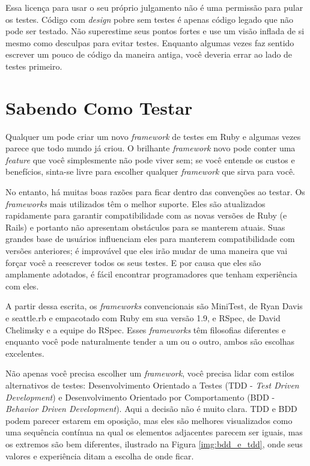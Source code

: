 Essa licença para usar o seu próprio julgamento não é uma permissão para pular os testes. Código com \textit{design} pobre sem testes é apenas código legado que não pode ser testado. Não superestime seus pontos fortes e use um visão inflada de si mesmo como desculpas para evitar testes. Enquanto algumas vezes faz sentido escrever um pouco de código da maneira antiga, você deveria errar ao lado de testes primeiro.

\section{Sabendo Como Testar}

Qualquer um pode criar um novo \textit{framework} de testes em Ruby e algumas vezes parece que todo mundo já criou. O brilhante \textit{framework} novo pode conter uma \textit{feature} que você simplesmente não pode viver sem; se você entende os custos e benefícios, sinta-se livre para escolher qualquer \textit{framework} que sirva para você.

No entanto, há muitas boas razões para ficar dentro das convenções ao testar. Os \textit{frameworks} mais utilizados têm o melhor suporte. Eles são atualizados rapidamente para garantir compatibilidade com as novas versões de Ruby (e Rails) e portanto não apresentam obstáculos para se manterem atuais. Suas grandes base de usuários influenciam eles para manterem compatibilidade com versões anteriores; é improvável que eles irão mudar de uma maneira que vai forçar você a reescrever todos os seus testes. E por causa que eles são amplamente adotados, é fácil encontrar programadores que tenham experiência com eles.

A partir dessa escrita, os \textit{frameworks} convencionais são MiniTest, de Ryan Davis e seattle.rb e empacotado com Ruby em sua versão 1.9, e RSpec, de David Chelimsky e a equipe do RSpec. Esses \textit{frameworks} têm filosofias diferentes e enquanto você pode naturalmente tender a um ou o outro, ambos são escolhas excelentes.

Não apenas você precisa escolher um  \textit{framework}, você precisa lidar com estilos alternativos de testes: Desenvolvimento Orientado a Testes (TDD - \textit{Test Driven Development}) e Desenvolvimento Orientado por Comportamento (BDD - \textit{Behavior Driven Development}). Aqui a decisão não é muito clara. TDD e BDD podem parecer estarem em oposição, mas eles são melhores visualizados como uma sequência contínua na qual os elementos adjacentes parecem ser iguais, mas os extremos são bem diferentes, ilustrado na Figura \ref{img:bdd_e_tdd}, onde seus valores e experiência ditam a escolha de onde ficar.

